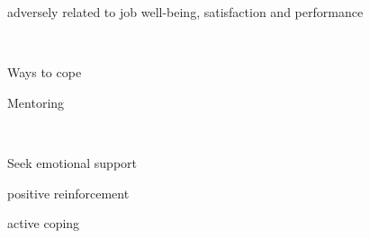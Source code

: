 \documentclass[aspectratio=169]{beamer}
\begin{document}
\begin{frame}
  \begin{center}
    \Huge adversely related to job well-being, satisfaction and performance

    \\ \small \cite{hh15}
  \end{center}
\end{frame}

\begin{frame}
  \begin{center}
    \Huge Ways to cope
  \end{center}
\end{frame}

\begin{frame}
  \begin{center}
    \Huge Mentoring

    \\ \small \cite{hh15}
  \end{center}
\end{frame}

\begin{frame}
  \begin{center}
    \Huge Seek emotional support
    \\ \small \cite{hh15}
  \end{center}
\end{frame}

\begin{frame}
  \begin{center}
    \Huge positive reinforcement
    \\ \small \cite{hh15}
  \end{center}
\end{frame}

\begin{frame}
  \begin{center}
    \Huge active coping
    \\ \small \cite{hh15}
  \end{center}
\end{frame}
\end{document}
